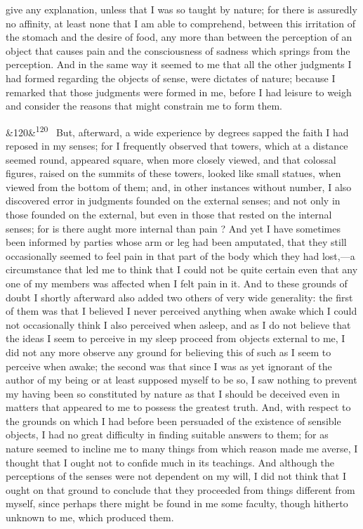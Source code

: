 \documentclass[12pt]{article}
\newcommand{\para}[1][]{\par\noindent\ifx&#1&\else\textsuperscript{\footnotesize #1}~\fi}
\begin{document}
give any explanation, unless that I was so taught by nature; for there is assuredly no affinity, at least none that I am able to comprehend, between this irritation of the stomach and the desire of food, any more than between the perception of an object that causes pain and the consciousness of sadness which springs from the perception. And in the same way it seemed to me that all the other judgments I had formed regarding the objects of sense, were dictates of nature; because I remarked that those judgments were formed in me, before I had leisure to weigh and consider the reasons that might constrain me to form them.

\para[120] But, afterward, a wide experience by degrees sapped the faith I had reposed in my senses; for I frequently observed that towers, which at a distance seemed round, appeared square, when more closely viewed, and that colossal figures, raised on the summits of these towers, looked like small statues, when viewed from the bottom of them; and, in other instances without number, I also discovered error in judgments founded on the external senses; and not only in those founded on the external, but even in those that rested on the internal senses; for is there aught more internal than pain ? And yet I have sometimes been informed by parties whose arm or leg had been amputated, that they still occasionally seemed to feel pain in that part of the body which they had lost,---a circumstance that led me to think that I could not be quite certain even that any one of my members was affected when I felt pain in it. And to these grounds of doubt I shortly afterward also added two others of very wide generality: the first of them was that I believed I never perceived anything when awake which I could not occasionally think I also perceived when asleep, and as I do not believe that the ideas I seem to perceive in my sleep proceed from objects external to me, I did not any more observe any ground for believing this of such as I seem to perceive when awake; the second was that since I was as yet ignorant of the author of my being or at least supposed myself to be so, I saw nothing to prevent my having been so constituted by nature as that I should be deceived even in matters that appeared to me to possess the greatest truth. And, with respect to the grounds on which I had before been persuaded of the existence of sensible objects, I had no great difficulty in finding suitable answers to them; for as nature seemed to incline me to many things from which reason made me averse, I thought that I ought not to confide much in its teachings. And although the perceptions of the senses were not dependent on my will, I did not think that I ought on that ground to conclude that they proceeded from things different from myself, since perhaps there might be found in me some faculty, though hitherto unknown to me, which produced them.
\end{document}
